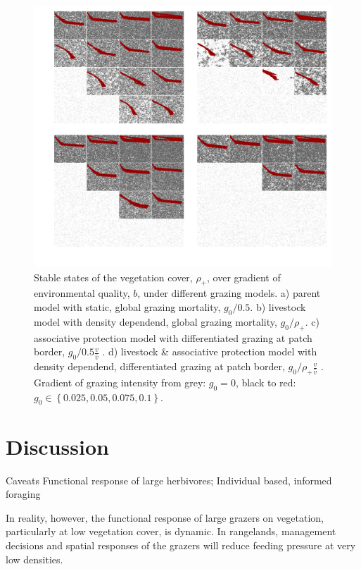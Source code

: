 \begin{figure}[h]%
\includegraphics[width=\columnwidth]{figures/patterns.pdf}%
\caption{Stable states of the vegetation cover, $\rho_+$, over gradient of environmental quality, $b$, under different grazing models. a) parent model with static, global grazing mortality, $g_0/0.5$. b) livestock model with density dependend, global grazing mortality, $g_0 / \rho_+$. c) associative protection model with differentiated grazing at patch border, $g_0/0.5 \frac{v}{\hat{v}}$ . d) livestock \& associative protection model with density dependend, differentiated grazing at patch border,  $g_0/ \rho_+ \frac{v}{\hat{v}}$ . Gradient of grazing intensity from grey: $g_0 = 0$, black to red: $g_0 \in \left\{ 0.025, 0.05, 0.075, 0.1 \right\}$.}%
\label{}%
\end{figure}



\section{Discussion}

Caveats
Functional response of large herbivores; Individual based, informed foraging


In reality, however, the functional response of large grazers on vegetation, particularly at low vegetation cover, is dynamic. In rangelands, management decisions and spatial responses of the grazers will reduce feeding pressure at very low densities. 

